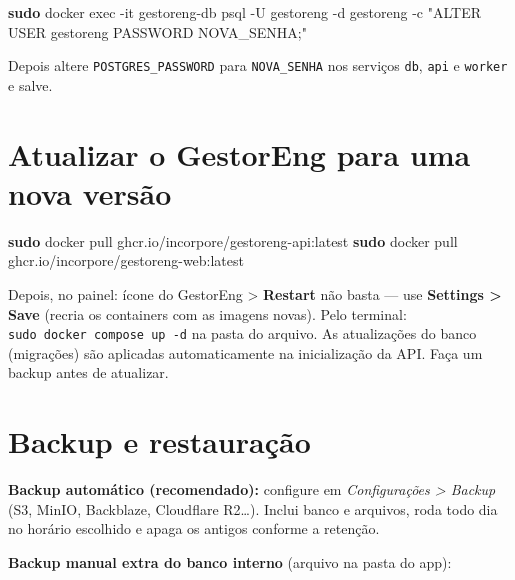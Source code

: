 \documentclass[
  10pt,
]{article}
\newenvironment{Shaded}{\begin{snugshade}}{\end{snugshade}}
\newcommand{\AttributeTok}[1]{\textcolor[rgb]{0.13,0.29,0.53}{#1}}
\newcommand{\FunctionTok}[1]{\textcolor[rgb]{0.13,0.29,0.53}{\textbf{#1}}}
\newcommand{\NormalTok}[1]{#1}
\newcommand{\StringTok}[1]{\textcolor[rgb]{0.31,0.60,0.02}{#1}}
\begin{document}
\begin{Shaded}
\begin{Highlighting}[]
\FunctionTok{sudo}\NormalTok{ docker exec }\AttributeTok{{-}it}\NormalTok{ gestoreng{-}db psql }\AttributeTok{{-}U}\NormalTok{ gestoreng }\AttributeTok{{-}d}\NormalTok{ gestoreng }\AttributeTok{{-}c} \StringTok{"ALTER USER gestoreng PASSWORD \textquotesingle{}NOVA\_SENHA\textquotesingle{};"}
\end{Highlighting}
\end{Shaded}

Depois altere \texttt{POSTGRES\_PASSWORD} para \texttt{NOVA\_SENHA} nos
serviços \texttt{db}, \texttt{api} e \texttt{worker} e salve.

\hypertarget{atualizar-o-gestoreng-para-uma-nova-versuxe3o}{%
\section{Atualizar o GestorEng para uma nova
versão}\label{atualizar-o-gestoreng-para-uma-nova-versuxe3o}}

\begin{Shaded}
\begin{Highlighting}[]
\FunctionTok{sudo}\NormalTok{ docker pull ghcr.io/incorpore/gestoreng{-}api:latest}
\FunctionTok{sudo}\NormalTok{ docker pull ghcr.io/incorpore/gestoreng{-}web:latest}
\end{Highlighting}
\end{Shaded}

Depois, no painel: ícone do GestorEng \textgreater{} \textbf{Restart}
não basta --- use \textbf{Settings \textgreater{} Save} (recria os
containers com as imagens novas). Pelo terminal:
\texttt{sudo\ docker\ compose\ up\ -d} na pasta do arquivo. As
atualizações do banco (migrações) são aplicadas automaticamente na
inicialização da API. Faça um backup antes de atualizar.

\hypertarget{backup-e-restaurauxe7uxe3o}{%
\section{Backup e restauração}\label{backup-e-restaurauxe7uxe3o}}

\textbf{Backup automático (recomendado):} configure em
\emph{Configurações \textgreater{} Backup} (S3, MinIO, Backblaze,
Cloudflare R2\ldots). Inclui banco e arquivos, roda todo dia no horário
escolhido e apaga os antigos conforme a retenção.

\textbf{Backup manual extra do banco interno} (arquivo na pasta do app):
\end{document}

